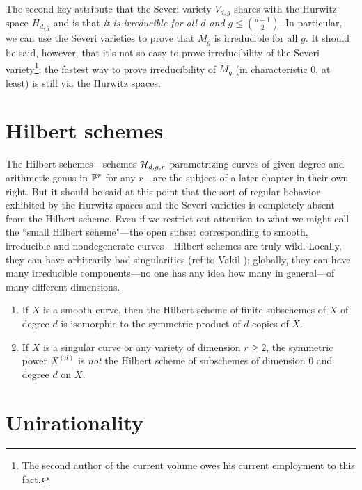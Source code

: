 The second key attribute that the Severi variety $V_{d,g}$ shares with the Hurwitz space $H_{d,g}$ and  is that \emph{it is irreducible for all $d$ and $g\leq \binom{d-1}{2}$}. In particular, we can use the Severi varieties to prove that $M_g$ is irreducible for all $g$. It should be said, however, that it's not so easy to prove irreducibility of the Severi variety\footnote{The second author of the current volume owes his current employment to this fact.}; the fastest way to prove irreducibility of $M_g$ (in characteristic 0, at least) is still via the Hurwitz spaces.

\section{Hilbert schemes}\label{hilbert scheme section}

The Hilbert schemes---schemes $\cH_{d,g,r}$ parametrizing curves of given degree and arithmetic genus in $\PP^r$ for any $r$---are the subject of a later chapter in their own right. But it should be said at this point that the sort of regular behavior exhibited by the Hurwitz spaces and the Severi varieties is completely absent from the Hilbert scheme. Even if we restrict out attention to  what we might call the ``small Hilbert scheme"---the open subset corresponding to smooth, irreducible and nondegenerate curves---Hilbert schemes are truly wild. Locally, they can have arbitrarily bad singularities (ref to Vakil ); globally, they can have many irreducible components---no one has any idea how many in general---of many different dimensions.

\begin{exercise}\label{symmetric power vs Hilbert scheme}
\begin{enumerate}
 \item If $X$ is a smooth curve, then the Hilbert scheme of finite subschemes of $X$ of degree $d$ is
 isomorphic to the symmetric product of $d$ copies of $X$.
 \item If $X$ is a singular curve or any variety of dimension $r \geq 2$, the symmetric power $X^{(d)}$ is \emph{not} the Hilbert scheme of subschemes of dimension 0 and degree $d$ on $X$. 
\end{enumerate}
 \end{exercise}


\section{Unirationality}

